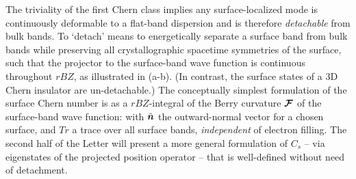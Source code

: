 \documentclass[aps,prl,showpacs,twocolumn,superscriptaddress]{revtex4-1}
\begin{document}
The triviality of the first Chern class implies any surface-localized mode is continuously deformable to a flat-band dispersion\cite{fidkowski_bulkboundary,nogo_AAJH} and is therefore  \textit{detachable} from   bulk  bands. To `detach' means to energetically separate a surface band from bulk bands while preserving all crystallographic spacetime symmetries of the surface,  such that the projector to the surface-band wave function is continuous  throughout $rBZ$, as illustrated in  (a-b).  (In contrast, the  surface states of a 3D Chern insulator\cite{kohmoto_3Dcherninsulator} are un-detachable.\cite{vanderbilt_book_berryelectronicstructure}) The conceptually simplest formulation of the surface Chern number is as a  $rBZ$-integral of the Berry curvature $\boldsymbol{{\cal F}}$ of the surface-band wave function: 
with $\hat{\boldsymbol{n}}$ the outward-normal vector for a chosen surface, and
$Tr$ a trace over all surface bands, \textit{independent} of electron filling. The second half of the Letter will present a more general formulation of $C_s$  -- via eigenstates of the projected position operator --  that is well-defined without need of detachment. 




\end{document}
